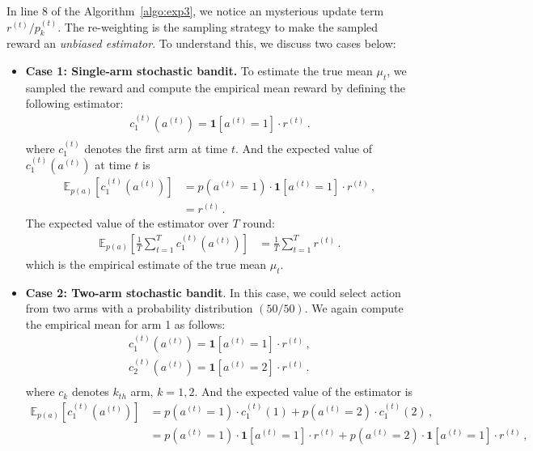 \documentclass[11pt]{article}
\begin{document}
In line 8 of the Algorithm~\ref{algo:exp3}, we notice an mysterious update term $r^{(t)}/p_k^{(t)}$. The re-weighting is the sampling strategy to make the sampled reward an \textit{unbiased estimator}. To understand this, we discuss two cases below:
\begin{itemize}
    \item \textbf{Case 1: Single-arm stochastic bandit.} To estimate the true mean $\mu_t$, we sampled the reward and compute the empirical mean reward by defining the following estimator:
    \begin{align*}
        c_1^{(t)}(a^{(t)}) = \mathbf{1} [a^{(t)} = 1] \cdot r^{(t)}\, . \\
    \end{align*}
    where $c_1^{(t)}$ denotes the first arm at time $t$. And the expected value of $ c_1^{(t)}(a^{(t)}) $ at time $t$ is
    \begin{align*}
        \mathbb{E}_{p(a)} \left[  c_1^{(t)}(a^{(t)}) \right] &= p (a^{(t)} = 1) \cdot \mathbf{1} [a^{(t)} = 1] \cdot r^{(t)} \, , \\
        &= r^{(t)}\, .
    \end{align*}
    The expected value of the estimator over $\textit{T}$ round:
    \begin{align*}
        \mathbb{E}_{p(a)} \left[ \frac{1}{T} \sum_{t=1}^{T} c_1^{(t)}(a^{(t)}) \right] &= \frac{1}{T} \sum_{t=1}^{T} r^{(t)} \, .
    \end{align*}
    which is the empirical estimate of the true mean $\mu_t$.
    \item \textbf{Case 2: Two-arm stochastic bandit}. In this case, we could select action from two arms with a probability distribution $(50/50)$. We again compute the empirical mean for arm 1 as follows:
    \begin{align*}
        c_1^{(t)}(a^{(t)}) = \mathbf{1} [a^{(t)} = 1] \cdot r^{(t)}\, , \\
        c_2^{(t)}(a^{(t)}) = \mathbf{1} [a^{(t)} = 2] \cdot r^{(t)}\, . \\
    \end{align*}
    where $c_k$ denotes $k_{th}$ arm, $k = 1, 2.$ And the expected value of the estimator is
    \begin{align}
        \mathbb{E}_{p(a)} \left[  c_1^{(t)}(a^{(t)}) \right] &= p (a^{(t)} = 1) \cdot c_1^{(t)}(1) + p (a^{(t)} = 2) \cdot c_1^{(t)}(2)\, , \nonumber \\
        &= p (a^{(t)} = 1) \cdot  \mathbf{1} [a^{(t)} = 1] \cdot r^{(t)} + p (a^{(t)} = 2) \cdot \mathbf{1} [a^{(t)} = 1] \cdot r^{(t)} \, ,  \nonumber \\

\end{align}
\end{itemize}
\end{document}
